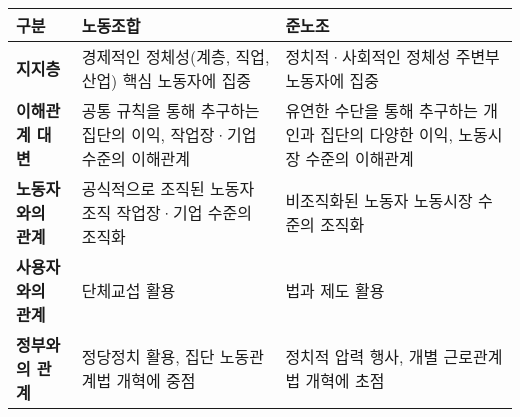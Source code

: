 \begin{tabular}{p{3cm} p{6cm} p{9cm}}
        \toprule
        \textbf{구분} & \textbf{노동조합} & \textbf{준노조} \\
        \midrule
        \textbf{지지층} & 
        경제적인 정체성(계층, 직업, 산업) \newline 핵심 노동자에 집중 &
        정치적·사회적인 정체성 \newline 주변부 노동자에 집중 \\
        \midrule
        \textbf{이해관계 대변} & 
        공통 규칙을 통해 추구하는 집단의 이익, 작업장·기업 수준의 이해관계 &
        유연한 수단을 통해 추구하는 개인과 집단의 다양한 이익, 노동시장 수준의 이해관계 \\
        \midrule
        \textbf{노동자와의 관계} & 
        공식적으로 조직된 노동자 조직 \newline 작업장·기업 수준의 조직화 &
        비조직화된 노동자 \newline 노동시장 수준의 조직화 \\
        \midrule
        \textbf{사용자와의 관계} & 
        단체교섭 활용 & 
        법과 제도 활용 \\
        \midrule
        \textbf{정부와의 관계} & 
        정당정치 활용, \newline 집단 노동관계법 개혁에 중점 &
        정치적 압력 행사, \newline 개별 근로관계법 개혁에 초점 \\
        \bottomrule
    \end{tabular}
